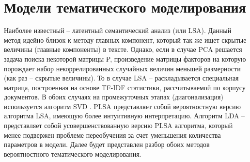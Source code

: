 \documentclass[aps,%
12pt,%
final,%
oneside,
onecolumn,%
musixtex, %
superscriptaddress,%
centertags]{article} %
\begin{document}
\section*{Модели тематического моделирования}
\hspace{0.4cm}
Наиболее известный – латентный семантический анализ (или LSA). Данный метод идейно близок к методу главных компонент, который так же ищет скрытые величины (главные компоненты) в тексте. Однако, если в случае PCA решается задача поиска некоторой матрицы P, произведение матрицы факторов на которую порождает набор некоррелированных случайных величин меньшей размерности (как раз – скрытые величины).  То в случае LSA – раскладывается специальная матрица, построенная на основе TF-IDF статистики, рассчитываемой по корпусу документов. В обоих случаях на промежуточных этапах (диагонализация) используется алгоритм SVD .
 PLSA представляет собой вероятностную версию алгоритма LSA, имеющую более интуитивную интерпретацию. Алгоритм LDA – представляет собой усовершенствованную версию PLSA алгоритма, который менее подвержен проблеме переобучения за счет уменьшения количества параметров в модели. Далее будет представлен разбор обоих методов вероятностного тематического моделирования.


\newpage
\end{document}
